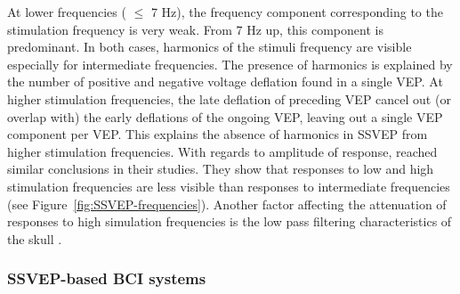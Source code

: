 At lower frequencies ( $\le$ 7 Hz), the frequency component corresponding to the stimulation frequency is very weak. 
From 7 Hz up, this component is predominant. 
In both cases, harmonics of the stimuli frequency are visible especially for intermediate frequencies. 
The presence of harmonics is explained by the number of positive and negative voltage deflation found in a single VEP. 
At higher stimulation frequencies, the late deflation of preceding VEP cancel out (or overlap with) the early deflations of the ongoing VEP, leaving out a single VEP component per VEP. 
This explains the absence of harmonics in SSVEP from higher stimulation frequencies. 
With regards to amplitude of response, \cite{pastor_human_2003} reached similar conclusions in their studies. 
They show that responses to low and high stimulation frequencies are less visible than responses to intermediate frequencies (see Figure~\ref{fig:SSVEP-frequencies}). 
Another factor affecting the attenuation of responses to high simulation frequencies is the low pass filtering characteristics of the skull \citep{nunez_electric_2005, bedard_model_2006}.

\subsubsection{SSVEP-based BCI systems}

